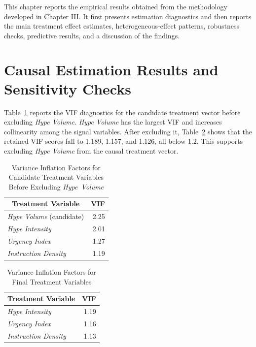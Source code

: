 
This chapter reports the empirical results obtained from the methodology developed in Chapter III. It first presents estimation diagnostics and then reports the main treatment effect estimates, heterogeneous-effect patterns, robustness checks, predictive results, and a discussion of the findings.

\section{Causal Estimation Results and Sensitivity Checks}
\label{sec:sample-description}
\label{sec:ate-results}
\label{sec:hte-results}
\label{sec:robustness}

Table~\ref{tab:vif-candidate-results} reports the VIF diagnostics for the candidate treatment vector before excluding \textit{Hype Volume}. \textit{Hype Volume} has the largest VIF and increases collinearity among the signal variables. After excluding it, Table~\ref{tab:vif-results} shows that the retained VIF scores fall to 1.189, 1.157, and 1.126, all below 1.2. This supports excluding \textit{Hype Volume} from the causal treatment vector.

\begin{table}[htbp]
\centering
\caption{Variance Inflation Factors for Candidate Treatment Variables Before Excluding \textit{Hype~Volume}}
\label{tab:vif-candidate-results}
\begin{tabular}{|l|r|}
\toprule
\multicolumn{1}{|c|}{\textbf{Treatment Variable}} & \multicolumn{1}{c|}{\textbf{VIF}} \\
\midrule
\textit{Hype Volume} (candidate) & 2.25 \\
\textit{Hype Intensity} & 2.01 \\
\textit{Urgency Index} & 1.27 \\
\textit{Instruction Density} & 1.19 \\
\bottomrule
\end{tabular}
\datasetsource
\end{table}

\begin{table}[htbp]
\centering
\caption{Variance Inflation Factors for Final Treatment Variables}
\label{tab:vif-results}
\begin{tabular}{|l|r|}
\toprule
\multicolumn{1}{|c|}{\textbf{Treatment Variable}} & \multicolumn{1}{c|}{\textbf{VIF}} \\
\midrule
\textit{Hype Intensity} & 1.19 \\
\textit{Urgency Index} & 1.16 \\
\textit{Instruction Density} & 1.13 \\
\bottomrule
\end{tabular}
\datasetsource
\end{table}


